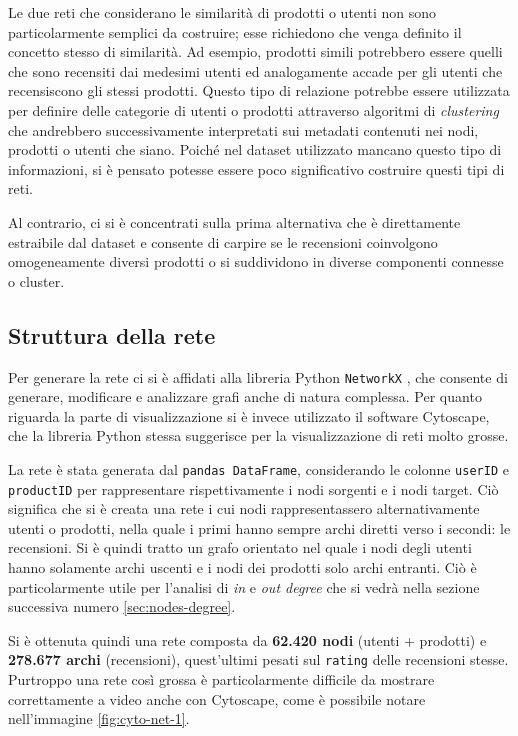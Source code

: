 \documentclass[hidelinks, 12pt]{article}
\begin{document}
Le due reti che considerano le similarità di prodotti o utenti non sono particolarmente semplici da costruire; esse richiedono che venga definito il concetto stesso di similarità. Ad esempio, prodotti simili potrebbero essere quelli che sono recensiti dai medesimi utenti ed analogamente accade per gli utenti che recensiscono gli stessi prodotti. Questo tipo di relazione potrebbe essere utilizzata per definire delle categorie di utenti o prodotti attraverso algoritmi di \textit{clustering} che andrebbero successivamente interpretati sui metadati contenuti nei nodi, prodotti o utenti che siano. Poiché nel dataset utilizzato mancano questo tipo di informazioni, si è pensato potesse essere poco significativo costruire questi tipi di reti.

Al contrario, ci si è concentrati sulla prima alternativa che è direttamente estraibile dal dataset e consente di carpire se le recensioni coinvolgono omogeneamente diversi prodotti o si suddividono in diverse componenti connesse o cluster.



\subsection{Struttura della rete}

Per generare la rete ci si è affidati alla libreria Python \texttt{NetworkX} \cite{site:networkx}, che consente di generare, modificare e analizzare grafi anche di natura complessa. Per quanto riguarda la parte di visualizzazione si è invece utilizzato il software Cytoscape, che la libreria Python stessa suggerisce per la visualizzazione di reti molto grosse.

La rete è stata generata dal \texttt{pandas DataFrame}, considerando le colonne \texttt{userID} e \texttt{productID} per rappresentare rispettivamente i nodi sorgenti e i nodi target. Ciò significa che si è creata una rete i cui nodi rappresentassero alternativamente utenti o prodotti, nella quale i primi hanno sempre archi diretti verso i secondi: le recensioni. Si è quindi tratto un grafo orientato nel quale i nodi degli utenti hanno solamente archi uscenti e i nodi dei prodotti solo archi entranti. Ciò è particolarmente utile per l'analisi di \textit{in} e \textit{out degree} che si vedrà nella sezione successiva numero \ref{sec:nodes-degree}.

Si è ottenuta quindi una rete composta da \textbf{62.420 nodi} (utenti + prodotti) e \textbf{278.677 archi} (recensioni), quest'ultimi pesati sul \texttt{rating} delle recensioni stesse. Purtroppo una rete così grossa è particolarmente difficile da mostrare correttamente a video anche con Cytoscape, come è possibile notare nell'immagine \ref{fig:cyto-net-1}.
\end{document}
